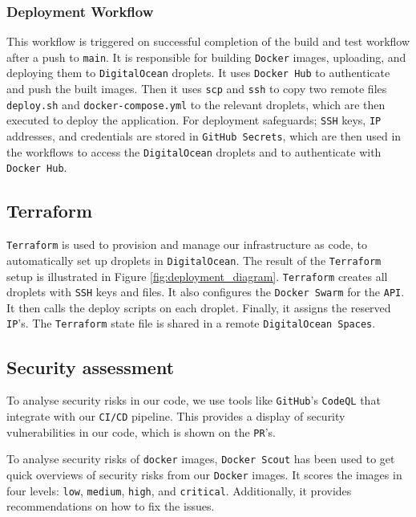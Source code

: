 \subsubsection{Deployment Workflow}
This workflow is triggered on successful completion of the build and test workflow 
after a push to \texttt{main}.
It is responsible for building \texttt{Docker} images, uploading, and deploying them to 
\texttt{DigitalOcean} droplets.
It uses \texttt{Docker Hub} to authenticate and push the built images.
Then it uses \texttt{scp} and \texttt{ssh} to copy two remote files \texttt{deploy.sh} 
and \texttt{docker-compose.yml} to the relevant droplets,
which are then executed to deploy the application.
For deployment safeguards; \texttt{SSH} keys, \texttt{IP} addresses, and credentials are stored in \texttt{GitHub Secrets},
which are then used in the workflows to access the \texttt{DigitalOcean} droplets and to 
authenticate with \texttt{Docker Hub}.


\subsection{Terraform}
\texttt{Terraform} is used to provision and manage our infrastructure as code, 
to automatically set up droplets in \texttt{DigitalOcean}. 
The result of the \texttt{Terraform} setup is illustrated 
in Figure \ref{fig:deployment_diagram}.
\texttt{Terraform} creates all droplets with \texttt{SSH} keys and files.
It also configures the \texttt{Docker Swarm} for the \texttt{API}.
It then calls the deploy scripts on each droplet.
Finally, it assigns the reserved \texttt{IP}'s.
The \texttt{Terraform} state file is shared in a remote \texttt{DigitalOcean Spaces}.

\subsection{Security assessment}
To analyse security risks in our code, 
we use tools like \texttt{GitHub}'s \texttt{CodeQL}\cite{codeql} that 
integrate with our \texttt{CI/CD} pipeline.
This provides a display of security vulnerabilities in our code,
which is shown on the \texttt{PR}'s.

To analyse security risks of \texttt{docker} images, \texttt{Docker Scout} has been used to get
quick overviews of security risks from our \texttt{Docker} images.
It scores the images in four levels: \texttt{low}, \texttt{medium}, \texttt{high}, and \texttt{critical}.
Additionally, it provides recommendations on how to fix the issues.

